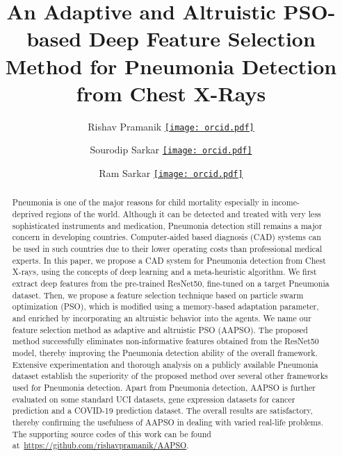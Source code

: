 \documentclass[final,3p,times]{elsarticle}
\newcommand{\orcid}[1]{\href{https://orcid.org/#1}{\texttt{[image: orcid.pdf]}}}
\begin{document}
\begin{frontmatter}

\title{An Adaptive and Altruistic PSO-based Deep Feature Selection Method for Pneumonia Detection from Chest X-Rays}


\author[inst1]{Rishav Pramanik \orcid{0000-0003-0144-8539}}


\author[inst2]{Sourodip Sarkar \orcid{0000-0002-7050-5835}}

\author[inst1]{Ram Sarkar \orcid{0000-0001-8813-4086}}

\begin{abstract}
Pneumonia is one of the major reasons for child mortality especially in {income-deprived} regions of the world. Although it can be detected and treated with very less sophisticated instruments and medication, Pneumonia detection still remains a major concern in developing countries. Computer-aided based diagnosis (CAD) systems can be used in such countries due to their lower operating costs than professional medical experts. In this paper, we propose a CAD system for Pneumonia detection from Chest X-rays, using the concepts of deep learning and a meta-heuristic algorithm. We first extract deep features from the pre-trained {ResNet50,} fine-tuned on a target Pneumonia dataset. Then, we propose a {feature selection} technique based on particle swarm optimization (PSO), which is modified using a memory-based adaptation parameter, and enriched by incorporating an altruistic {behavior} into the agents. We name our {feature selection} method as adaptive and altruistic PSO (AAPSO). The proposed method successfully eliminates non-informative features obtained from the ResNet50 model, thereby improving the Pneumonia detection ability of the overall framework. Extensive experimentation and thorough analysis on a publicly available Pneumonia dataset establish the superiority of the proposed method over several other frameworks used for Pneumonia detection. {Apart from Pneumonia detection, AAPSO is further evaluated on some standard UCI datasets, gene expression datasets for cancer prediction and a COVID-19 prediction dataset. The overall results are satisfactory, thereby confirming the usefulness of AAPSO in dealing with varied real-life problems. The supporting source codes of this work can be found at~\href{https://github.com/rishavpramanik/AAPSO}{https://github.com/rishavpramanik/AAPSO}.}\end{abstract}


\end{frontmatter}
\end{document}
